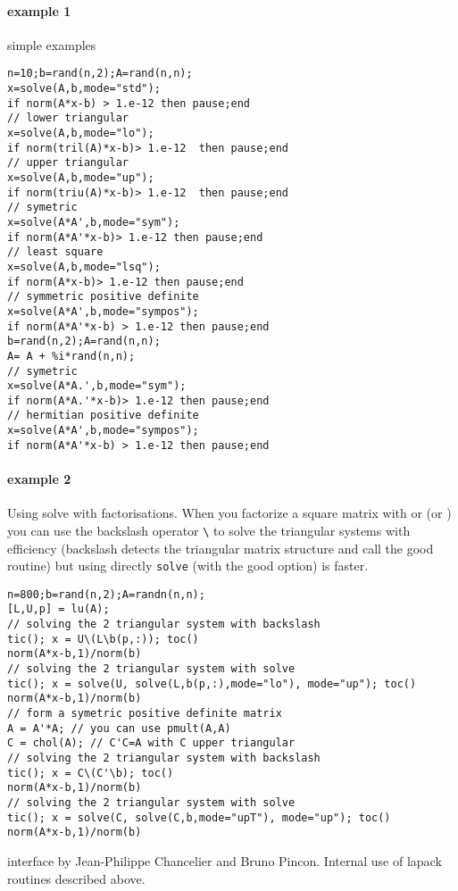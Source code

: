 \begin{examples}
\paragraph{example 1} simple examples
\begin{Verbatim}
n=10;b=rand(n,2);A=rand(n,n);
x=solve(A,b,mode="std"); 
if norm(A*x-b) > 1.e-12 then pause;end 
// lower triangular
x=solve(A,b,mode="lo"); 
if norm(tril(A)*x-b)> 1.e-12  then pause;end 
// upper triangular 
x=solve(A,b,mode="up"); 
if norm(triu(A)*x-b)> 1.e-12  then pause;end 
// symetric 
x=solve(A*A',b,mode="sym"); 
if norm(A*A'*x-b)> 1.e-12 then pause;end 
// least square 
x=solve(A,b,mode="lsq"); 
if norm(A*x-b)> 1.e-12 then pause;end 
// symmetric positive definite 
x=solve(A*A',b,mode="sympos"); 
if norm(A*A'*x-b) > 1.e-12 then pause;end 
b=rand(n,2);A=rand(n,n);
A= A + %i*rand(n,n);
// symetric 
x=solve(A*A.',b,mode="sym"); 
if norm(A*A.'*x-b)> 1.e-12 then pause;end 
// hermitian positive definite 
x=solve(A*A',b,mode="sympos"); 
if norm(A*A'*x-b) > 1.e-12 then pause;end
\end{Verbatim}

\paragraph{example 2} Using solve with factorisations. When you factorize a square 
matrix with  or  (or ) you can
use the backslash operator \verb+\+ to solve the triangular systems with efficiency
(backslash detects the triangular matrix structure and call the good routine) but 
using directly \verb+solve+ (with the good option) is faster.
\begin{Verbatim}
n=800;b=rand(n,2);A=randn(n,n);
[L,U,p] = lu(A); 
// solving the 2 triangular system with backslash
tic(); x = U\(L\b(p,:)); toc()
norm(A*x-b,1)/norm(b) 
// solving the 2 triangular system with solve
tic(); x = solve(U, solve(L,b(p,:),mode="lo"), mode="up"); toc()
norm(A*x-b,1)/norm(b) 
// form a symetric positive definite matrix
A = A'*A; // you can use pmult(A,A)
C = chol(A); // C'C=A with C upper triangular  
// solving the 2 triangular system with backslash
tic(); x = C\(C'\b); toc()
norm(A*x-b,1)/norm(b) 
// solving the 2 triangular system with solve
tic(); x = solve(C, solve(C,b,mode="upT"), mode="up"); toc()
norm(A*x-b,1)/norm(b)
\end{Verbatim}

\end{examples}

\begin{authors}
   interface by Jean-Philippe Chancelier and Bruno Pincon. Internal use of lapack 
   routines described above.
\end{authors}
